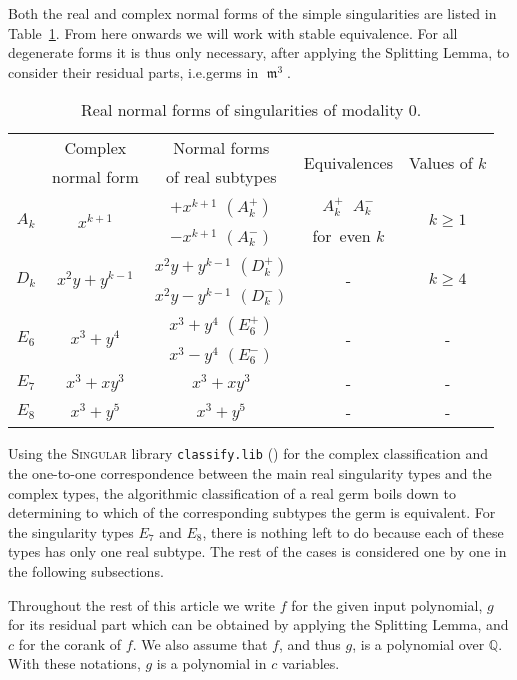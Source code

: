 \documentclass[noend]{amsproc}
\theoremstyle{definition}
\newcommand{\classify}{\texttt{classify.lib}}
\DeclareMathOperator{\requiv}{\overset{r}{\sim}}
\DeclareMathOperator{\m}{\mathfrak{m}}
\begin{document}
Both the real and complex normal forms of the simple singularities are listed
in Table~\ref{tab:normal_forms}. From here onwards we will work with stable
equivalence. For all degenerate forms it is thus only necessary, after
applying the Splitting Lemma, to consider their residual parts, i.e.\@ germs in $\m^3$.

\begin{table}[!htb]
\centering
\caption{Real normal forms of singularities of modality $0$.}
\label{tab:normal_forms}
\begin{tabular}{|c|c|c|c|c|}
\hline
& Complex & Normal forms & \multirow{2}{*}{Equivalences} &
\multirow{2}{*}{Values of $k$} \\
& normal form & of real subtypes & & \\
\hline
\multirow{2}{*}{$A_k$} & \multirow{2}{*}{$x^{k+1}$} & $+x^{k+1}$ $(A_k^+)$ &
$A_k^+ \requiv A_k^-$ & \multirow{2}{*}{$k \geq 1$} \\
& & $-x^{k+1}$ $(A_k^-)$ & for~even $k$ & \\
\hline
\multirow{2}{*}{$D_k$} & \multirow{2}{*}{$x^2y+y^{k-1}$} &
$x^2y+y^{k-1}$ $(D_k^+)$ & \multirow{2}{*}{-} &
\multirow{2}{*}{$k \geq 4$} \\
& & $x^2y-y^{k-1}$ $(D_k^-)$ & & \\
\hline
\multirow{2}{*}{$E_6$} & \multirow{2}{*}{$x^3+y^4$} & $x^3+y^4$ $(E_6^+)$ &
\multirow{2}{*}{-} & \multirow{2}{*}{-} \\
& & $x^3-y^4$ $(E_6^-)$ & & \\
\hline
$E_7$ & $x^3+xy^3$ & $x^3+xy^3$ & - & - \\
\hline
$E_8$ & $x^3+y^5$ & $x^3+y^5$ & - & - \\
\hline
\end{tabular}
\end{table}

Using the \textsc{Singular} library \classify{} (\cite{classify}) for the
complex classification and the one-to-one correspondence between the main real
singularity types and the complex types, the algorithmic classification of a
real germ boils down to determining to which of the corresponding subtypes the
germ is equivalent. For the singularity types $E_7$ and $E_8$, there is nothing
left to do because each of these types has only one real subtype. The rest of
the cases is considered one by one in the following subsections.

Throughout the rest of this article we write $f$ for the given input
polynomial, $g$ for its residual part which can be obtained by applying the
Splitting Lemma, and $c$ for the corank of $f$. We also assume that $f$, and
thus $g$, is a polynomial over $\mathbb Q$. With these notations, $g$ is a
polynomial in $c$ variables.
\end{document}
